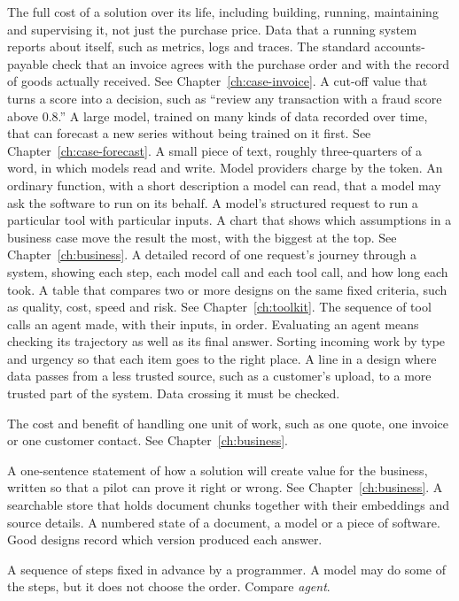 \begin{description}[style=nextline, leftmargin=1.2em, itemsep=4pt, font=\normalfont\bfseries\sffamily\small]
 The full cost of a solution over its life, including building, running, maintaining and supervising it, not just the purchase price.
 Data that a running system reports about itself, such as metrics, logs and traces.
 The standard accounts-payable check that an invoice agrees with the purchase order and with the record of goods actually received. See Chapter~\ref{ch:case-invoice}.
 A cut-off value that turns a score into a decision, such as ``review any transaction with a fraud score above 0.8.''
 A large model, trained on many kinds of data recorded over time, that can forecast a new series without being trained on it first. See Chapter~\ref{ch:case-forecast}.
 A small piece of text, roughly three-quarters of a word, in which models read and write. Model providers charge by the token.
 An ordinary function, with a short description a model can read, that a model may ask the software to run on its behalf.
 A model's structured request to run a particular tool with particular inputs.
 A chart that shows which assumptions in a business case move the result the most, with the biggest at the top. See Chapter~\ref{ch:business}.
 A detailed record of one request's journey through a system, showing each step, each model call and each tool call, and how long each took.
 A table that compares two or more designs on the same fixed criteria, such as quality, cost, speed and risk. See Chapter~\ref{ch:toolkit}.
 The sequence of tool calls an agent made, with their inputs, in order. Evaluating an agent means checking its trajectory as well as its final answer.
 Sorting incoming work by type and urgency so that each item goes to the right place.
 A line in a design where data passes from a less trusted source, such as a customer's upload, to a more trusted part of the system. Data crossing it must be checked.

 The cost and benefit of handling one unit of work, such as one quote, one invoice or one customer contact. See Chapter~\ref{ch:business}.

 A one-sentence statement of how a solution will create value for the business, written so that a pilot can prove it right or wrong. See Chapter~\ref{ch:business}.
 A searchable store that holds document chunks together with their embeddings and source details.
 A numbered state of a document, a model or a piece of software. Good designs record which version produced each answer.

 A sequence of steps fixed in advance by a programmer. A model may do some of the steps, but it does not choose the order. Compare \emph{agent}.
\end{description}
